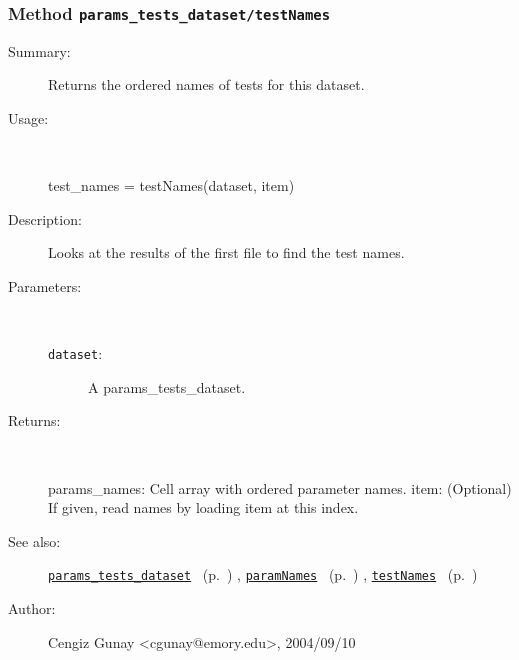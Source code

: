 \subsubsection[Method \texttt{testNames}]{Method \texttt{params\_tests\_dataset/testNames}}%
%
\label{ref_params_tests_dataset__testNames}%
\hypertarget{ref_params_tests_dataset__testNames}{}%
\begin{description}
\item[Summary:]Returns the ordered names of tests for this dataset.
%
\item[Usage:]~%
\begin{lyxcode}%
test\_names = testNames(dataset, item)
%
\end{lyxcode}%
%
\item[Description:]%
Looks at the results of the first file to find the test names.
\item[Parameters:]~
\begin{description}%
\item[\texttt{dataset}:]
 A params\_tests\_dataset.
\end{description}%
%
\item[Returns:]~

	params\_names: Cell array with ordered parameter names.
	item: (Optional) If given, read names by loading item at this index.
%
%
\item[See also:]%
\hyperlink{ref_params_tests_dataset}{\texttt{params\_tests\_dataset}}%
\ (p.~\pageref{ref_params_tests_dataset})%
%
, \hyperlink{ref_paramNames}{\texttt{paramNames}}%
\ (p.~\pageref{ref_paramNames})%
%
, \hyperlink{ref_testNames}{\texttt{testNames}}%
\ (p.~\pageref{ref_testNames})%
%
%
\item[Author:]%
Cengiz Gunay <cgunay@emory.edu>, 2004/09/10%
\end{description}
\methodline%
